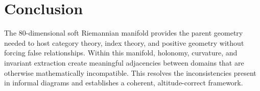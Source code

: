 \documentclass[11pt]{article}
\begin{document}
\section{Conclusion}
The 80-dimensional soft Riemannian manifold provides the parent geometry needed
to host category theory, index theory, and positive geometry without forcing
false relationships. Within this manifold, holonomy, curvature, and invariant
extraction create meaningful adjacencies between domains that are otherwise
mathematically incompatible. This resolves the inconsistencies present in
informal diagrams and establishes a coherent, altitude-correct framework.
\end{document}
